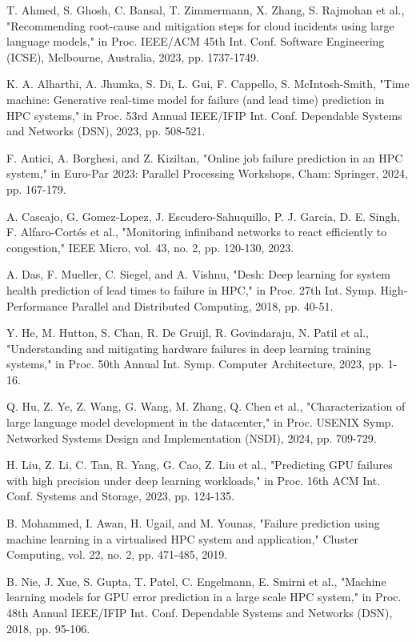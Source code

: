 \documentclass[conference]{IEEEtran}
\begin{document}
\newpage
\begin{thebibliography}{00}
 T. Ahmed, S. Ghosh, C. Bansal, T. Zimmermann, X. Zhang, S. Rajmohan et al., "Recommending root-cause and mitigation steps for cloud incidents using large language models," in Proc. IEEE/ACM 45th Int. Conf. Software Engineering (ICSE), Melbourne, Australia, 2023, pp. 1737-1749.

 K. A. Alharthi, A. Jhumka, S. Di, L. Gui, F. Cappello, S. McIntosh-Smith, "Time machine: Generative real-time model for failure (and lead time) prediction in HPC systems," in Proc. 53rd Annual IEEE/IFIP Int. Conf. Dependable Systems and Networks (DSN), 2023, pp. 508-521.

 F. Antici, A. Borghesi, and Z. Kiziltan, "Online job failure prediction in an HPC system," in Euro-Par 2023: Parallel Processing Workshops, Cham: Springer, 2024, pp. 167-179.

 A. Cascajo, G. Gomez-Lopez, J. Escudero-Sahuquillo, P. J. Garcia, D. E. Singh, F. Alfaro-Cortés et al., "Monitoring infiniband networks to react efficiently to congestion," IEEE Micro, vol. 43, no. 2, pp. 120-130, 2023.

 A. Das, F. Mueller, C. Siegel, and A. Vishnu, "Desh: Deep learning for system health prediction of lead times to failure in HPC," in Proc. 27th Int. Symp. High-Performance Parallel and Distributed Computing, 2018, pp. 40-51.

 Y. He, M. Hutton, S. Chan, R. De Gruijl, R. Govindaraju, N. Patil et al., "Understanding and mitigating hardware failures in deep learning training systems," in Proc. 50th Annual Int. Symp. Computer Architecture, 2023, pp. 1-16.

 Q. Hu, Z. Ye, Z. Wang, G. Wang, M. Zhang, Q. Chen et al., "Characterization of large language model development in the datacenter," in Proc. USENIX Symp. Networked Systems Design and Implementation (NSDI), 2024, pp. 709-729.

 H. Liu, Z. Li, C. Tan, R. Yang, G. Cao, Z. Liu et al., "Predicting GPU failures with high precision under deep learning workloads," in Proc. 16th ACM Int. Conf. Systems and Storage, 2023, pp. 124-135.

 B. Mohammed, I. Awan, H. Ugail, and M. Younas, "Failure prediction using machine learning in a virtualised HPC system and application," Cluster Computing, vol. 22, no. 2, pp. 471-485, 2019.

 B. Nie, J. Xue, S. Gupta, T. Patel, C. Engelmann, E. Smirni et al., "Machine learning models for GPU error prediction in a large scale HPC system," in Proc. 48th Annual IEEE/IFIP Int. Conf. Dependable Systems and Networks (DSN), 2018, pp. 95-106.


\end{thebibliography}
\end{document}
